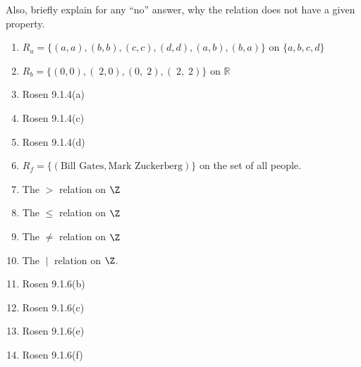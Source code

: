 \begin{questions}
Also, briefly explain for any ``no'' answer, why the relation does not have a given property. 

\begin{enumerate}[label=(\alph*),itemsep=0pt,parsep=0pt,topsep=0pt,partopsep=0pt]
	\item $R_a = \{ (a,a),(b,b),(c,c),(d,d),(a,b),(b,a) \}$ on $\{a, b, c, d\}$
	\item $R_b = \{ (0, 0), (􏰁2, 0), (0, 􏰁2), (􏰁2, 􏰁2) \}$ on $\mathbb{R}$ 
	\item Rosen 9.1.4(a) %
	\item Rosen 9.1.4(c) 
	\item Rosen 9.1.4(d) 
	\item $R_f = \{ (\text{Bill Gates}, \text{Mark Zuckerberg}) \}$ on the set of all people.
	\item The $>$ relation on $\Z$ 
	\item The $\leq$ relation on $\Z$ 
	\item The $\neq$ relation on $\Z$ 
	\item The $\;|\;$ relation on $\Z$. 
	\item Rosen 9.1.6(b)
	\item Rosen 9.1.6(c)
	\item Rosen 9.1.6(e) 
	\item Rosen 9.1.6(f) 
\end{enumerate}


\end{questions}
